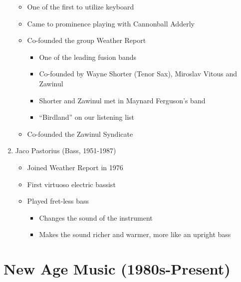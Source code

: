\documentclass[]{article}
\providecommand{\tightlist}{%
  \setlength{\itemsep}{0pt}\setlength{\parskip}{0pt}}
\begin{document}
\begin{enumerate}
  \begin{itemize}
  \tightlist
  \item
    One of the first to utilize keyboard
  \item
    Came to prominence playing with Cannonball Adderly
  \item
    Co-founded the group Weather Report

    \begin{itemize}
    \tightlist
    \item
      One of the leading fusion bands
    \item
      Co-founded by Wayne Shorter (Tenor Sax), Miroslav Vitous and
      Zawinul
    \item
      Shorter and Zawinul met in Maynard Ferguson's band
    \item
      ``Birdland'' on our listening list
    \end{itemize}
  \item
    Co-founded the Zawinul Syndicate
  \end{itemize}
\item
  Jaco Pastorius (Bass, 1951-1987)

  \begin{itemize}
  \tightlist
  \item
    Joined Weather Report in 1976
  \item
    First virtuoso electric bassist
  \item
    Played fret-less bass

    \begin{itemize}
    \tightlist
    \item
      Changes the sound of the instrument
    \item
      Makes the sound richer and warmer, more like an upright bass
    \end{itemize}
  \end{itemize}
\end{enumerate}

\section{New Age Music
(1980s-Present)}\label{new-age-music-1980s-present}
\end{document}

